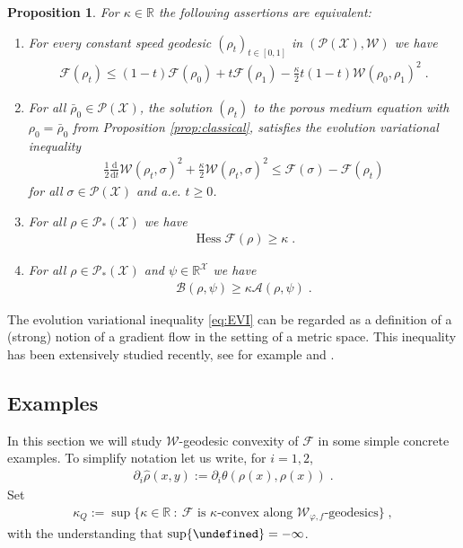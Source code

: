 \documentclass[a4paper,11pt,reqno]{amsart}
\let\emptyset \undefined
\theoremstyle{plain}
\newtheorem{proposition}[theorem]{Proposition}
\theoremstyle{remark}
\numberwithin{equation}{section}
\begin{document}
\begin{proposition}\label{prop:Daneri-Savare}
  For $\kappa \in {{\mathbb R}}$ the following assertions are equivalent:
\begin{enumerate}
\item For every constant speed geodesic $(\rho_t)_{t \in [0,1]}$
  in $({{\mathscr{P}}({\mathcal{X}})}, {\mathcal{W}})$ we have
\begin{align}\label{eq:K-convex}
  {\mathcal{F}}(\rho_t) \leq
  (1-t) {\mathcal{F}}(\rho_0) + t {\mathcal{F}}(\rho_1) - \frac\kappa{2} t(1-t) {\mathcal{W}}(\rho_0, \rho_1)^2\;.
\end{align}
\item For all $\bar\rho_0 \in {{\mathscr{P}}({\mathcal{X}})}$, the solution $(\rho_t)$ to the
  porous medium equation with $\rho_0 = \bar\rho_0$ from Proposition
  \ref{prop:classical}, satisfies the evolution variational inequality
\begin{align}\label{eq:EVI}
  \frac{1}{2}{\frac{\mathrm{d}}{\mathrm{d}t}} {\mathcal{W}}(\rho_t, \sigma)^2 + \frac{\kappa}{2}
{\mathcal{W}}(\rho_t, \sigma)^2 \leq {\mathcal{F}}(\sigma) - {\mathcal{F}}(\rho_t)
\end{align}
for all $\sigma \in {{\mathscr{P}}({\mathcal{X}})}$ and a.e. $t \geq 0$.
\item For all $\rho \in {{\mathscr{P}}_*({\mathcal{X}})}$ we have 
\begin{align*}
\operatorname{Hess} {\mathcal{F}}(\rho) \geq \kappa\;.
\end{align*}
\item For all $\rho \in {{\mathscr{P}}_*({\mathcal{X}})}$ and $\psi \in {{\mathbb R}}^{\mathcal{X}}$ we have
\begin{align*}
 {\mathcal{B}}(\rho, \psi) \geq \kappa {\mathcal{A}}(\rho, \psi)\;.
\end{align*}
\end{enumerate}
\end{proposition}

The evolution variational inequality \eqref{eq:EVI} can be regarded as
a definition of a (strong) notion of a gradient flow in the setting of
a metric space.  This inequality has been extensively studied
recently, see for example \cite{AGS08} and \cite[Section 3]{DS08}.

\subsection{Examples}
In this section we will study ${\mathcal{W}}$-geodesic convexity of ${\mathcal{F}}$ in
some simple concrete examples.  To simplify notation let us write, for
$i = 1, 2$,
\begin{align*}
 \partial_i {\hat\rho}(x,y) :=  \partial_i \theta(\rho(x),\rho(x))\;.
\end{align*}
Set
\begin{align}\label{eq:kappa-q}
\kappa_Q := \sup \{ \kappa \in {{\mathbb R}} \ : \ {\mathcal{F}} \text{ is $\kappa$-convex along ${\mathcal{W}}_{{\varphi},f}$-geodesics}  \}\;,
\end{align}
with the understanding that $\sup\{\emptyset\} = - \infty$.
\end{document}
